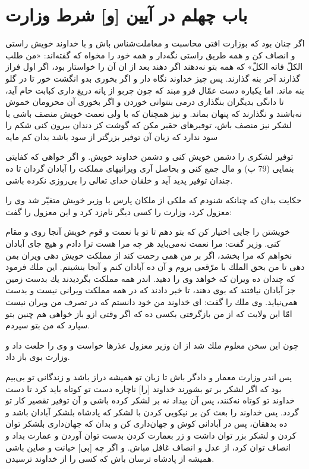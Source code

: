 \section*{باب چهلم
در آيين [و] شرط وزارت}

اگر چنان بود كه بوزارت افتى محاسبت و معاملت‌شناس باش و با خداوند خويش راستى و انصاف كن و همه طريق راستى نگه‌دار و همه خود را مخواه كه گفته‌اند: «من طلب الكلّ فاته الكلّ» كه همه بتو نه‌دهند اگر دهند بعد از ان آن را خواستار بود، اگر اول فراز گذارند آخر بنه گذارند. پس چيز خداوند نگاه دار و اگر بخورى بدو انگشت خور تا در گلو بنه ماند. اما يكباره دست عمّال فرو مبند كه چون چربو از پانه دريغ دارى كبابت خام آيد، تا دانگى بديگران بنگذارى درمى بنتوانى خوردن و اگر بخورى آن محرومان خموش نه‌باشند و نگذارند كه پنهان بماند. و نيز همچنان كه با ولى نعمت خويش منصف باشى با لشكر نيز منصف باش، توفيرهاى حقير مكن كه گوشت كز دندان بيرون كنى شكم را سود ندارد كه زيان آن توفير بزرگتر از سود باشد بدان كم مايه

توفير لشكرى را دشمن خويش كنى و دشمن خداوند خويش. و اگر خواهى كه كفايتى بنمايى (79 پ) و مال جمع كنى و بحاصل آرى ويرانيهاى مملكت را آبادان گردان تا ده چندان توفير پديد آيد و خلقان خداى تعالى را بى‌روزى نكرده باشى.

حكايت بدان كه چنانكه شنودم كه ملكى از ملكان پارس با وزير خويش متغيّر شد وى را معزول كرد، وزارت را كسى ديگر نام‌زد كرد و اين معزول را گفت:

خويشتن را جايى اختيار كن كه بتو دهم تا تو با نعمت و قوم خويش آنجا روى و مقام كنى. وزير گفت: مرا نعمت نه‌مى‌بايد هر چه مرا هست ترا دادم و هيچ جاى آبادان نخواهم كه مرا بخشد، اگر بر من  همى رحمت كند از مملكت خويش دهى ويران بمن دهى تا من بحق الملك با مرّقعى بروم و آن ده آبادان كنم و آنجا بنشينم. اين ملك فرمود كه چندان ده ويران كه خواهد وى را دهيد. اندر همه مملكت بگرديدند يك بدست زمين جز آبادان نيافتند كه بوى دهند، تا خبر دادند كه در همه مملكت ويرانى نيست و بدست همى‌نيايد. وى ملك را گفت: اى خداوند من خود دانستم كه در تصرف من ويران نيست امّا اين ولايت كه از من بازگرفتى بكسى ده كه اگر وقتى ازو باز خواهى هم چنين بتو سپارد كه من بتو سپردم.

چون اين سخن معلوم ملك شد از ان وزير معزول عذرها خواست و وى را خلعت داد و وزارت بوى باز داد.

پس اندر وزارت معمار و دادگر باش تا زبان تو هميشه دراز باشد و زندگانى تو بى‌بيم بود كه اگر لشكر بر تو بشورند خداوند [را] ناچاره دست تو كوتاه بايد كرد تا دست خداوند تو كوتاه نه‌كنند، پس آن بيداد نه بر لشكر كرده باشى و آن توفير تقصير كار تو گردد. پس خداوند را بعث كن بر نيكويى كردن با لشكر كه پادشاه بلشكر آبادان باشد و ده بدهقان، پس در آبادانى كوش و جهان‌دارى كن و بدان كه جهان‌دارى بلشكر توان كردن و لشكر بزر توان داشت و زر بعمارت كردن بدست توان آوردن و عمارت بداد و انصاف توان كرد، از عدل و انصاف غافل مباش. و اگر چه [بى] خيانت و صاين باشى هميشه از پادشاه ترسان باش كه كسى را از خداوند ترسيدن.